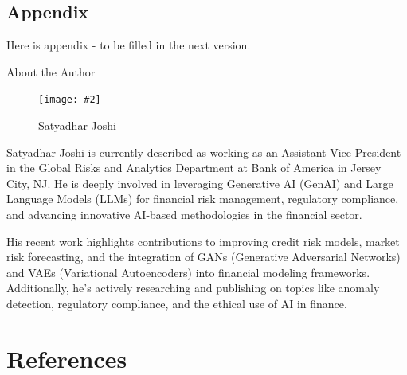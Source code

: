 \documentclass[a4paper,headinclude=on,footinclude=on,12pt,oneside]{scrbook}
\newcommand{\standardfigure}[3]{\begin{figure}[H]\begin{center}\texttt{[image: \#2]}\caption{#3}\label{fig:#2}\end{center}\end{figure}}
\begin{document}
\begin{appendices}
	
	\chapter*{Appendix }
	
	Here is appendix - to be filled in the next version.
	
	
	
\end{appendices}

\printindex
{}


About the Author

\standardfigure{\textwidth/2}{about/author_joshi}{Satyadhar Joshi}

Satyadhar Joshi is currently described as working as an Assistant Vice President in the Global Risks and Analytics Department at Bank of America in Jersey City, NJ. He is deeply involved in leveraging Generative AI (GenAI) and Large Language Models (LLMs) for financial risk management, regulatory compliance, and advancing innovative AI-based methodologies in the financial sector.

His recent work highlights contributions to improving credit risk models, market risk forecasting, and the integration of GANs (Generative Adversarial Networks) and VAEs (Variational Autoencoders) into financial modeling frameworks. Additionally, he's actively researching and publishing on topics like anomaly detection, regulatory compliance, and the ethical use of AI in finance.




\chapter*{References}
\end{document}
